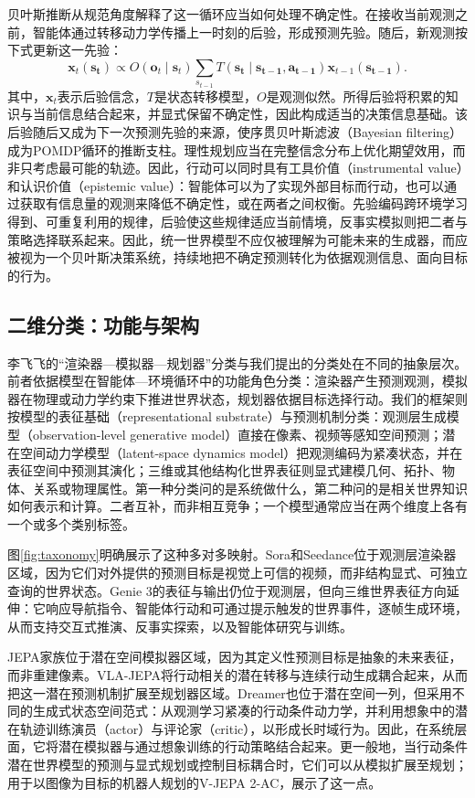 贝叶斯推断从规范角度解释了这一循环应当如何处理不确定性。在接收当前观测之前，智能体通过转移动力学传播上一时刻的后验，形成预测先验。随后，新观测按下式更新这一先验：
\begin{equation}
\mathbf{x}_t(\mathbf{s_t})\propto O(\mathbf{o}_t\mid\mathbf{s}_t)\sum_{s_{t-1}}T(\mathbf{s_t}\mid \mathbf{s_{t-1}},\mathbf{a_{t-1}})\mathbf{x}_{t-1}(\mathbf{s_{t-1}}).
\end{equation}
其中，$\mathbf{x}_t$表示后验信念，$T$是状态转移模型，$O$是观测似然。所得后验将积累的知识与当前信息结合起来，并显式保留不确定性，因此构成适当的决策信息基础。该后验随后又成为下一次预测先验的来源，使序贯贝叶斯滤波（Bayesian filtering）成为POMDP循环的推断支柱。理性规划应当在完整信念分布上优化期望效用，而非只考虑最可能的轨迹。因此，行动可以同时具有工具价值（instrumental value）和认识价值（epistemic value）：智能体可以为了实现外部目标而行动，也可以通过获取有信息量的观测来降低不确定性，或在两者之间权衡。先验编码跨环境学习得到、可重复利用的规律，后验使这些规律适应当前情境，反事实模拟则把二者与策略选择联系起来。因此，统一世界模型不应仅被理解为可能未来的生成器，而应被视为一个贝叶斯决策系统，持续地把不确定预测转化为依据观测信息、面向目标的行为。

\subsection{二维分类：功能与架构}
李飞飞的“渲染器—模拟器—规划器”分类与我们提出的分类处在不同的抽象层次。前者依据模型在智能体—环境循环中的功能角色分类：渲染器产生预测观测，模拟器在物理或动力学约束下推进世界状态，规划器依据目标选择行动。我们的框架则按模型的表征基础（representational substrate）与预测机制分类：观测层生成模型（observation-level generative model）直接在像素、视频等感知空间预测；潜在空间动力学模型（latent-space dynamics model）把观测编码为紧凑状态，并在表征空间中预测其演化；三维或其他结构化世界表征则显式建模几何、拓扑、物体、关系或物理属性。第一种分类问的是系统做什么，第二种问的是相关世界知识如何表示和计算。二者互补，而非相互竞争；一个模型通常应当在两个维度上各有一个或多个类别标签。

图\ref{fig:taxonomy}明确展示了这种多对多映射。Sora和Seedance位于观测层渲染器区域，因为它们对外提供的预测目标是视觉上可信的视频，而非结构显式、可独立查询的世界状态\citep{openai2024sora,gao2025seedance}。Genie 3的表征与输出仍位于观测层，但向三维世界表征方向延伸\citep{genie3}：它响应导航指令、智能体行动和可通过提示触发的世界事件，逐帧生成环境，从而支持交互式推演、反事实探索，以及智能体研究与训练。

JEPA家族位于潜在空间模拟器区域，因为其定义性预测目标是抽象的未来表征，而非重建像素\citep{assran2023ijepa,bardes2024vjepa}。VLA-JEPA将行动相关的潜在转移与连续行动生成耦合起来，从而把这一潜在预测机制扩展至规划器区域\citep{sun2026vlajepa}。Dreamer也位于潜在空间一列，但采用不同的生成式状态空间范式\citep{hafner2019dreamer}：从观测学习紧凑的行动条件动力学，并利用想象中的潜在轨迹训练演员（actor）与评论家（critic），以形成长时域行为。因此，在系统层面，它将潜在模拟器与通过想象训练的行动策略结合起来。更一般地，当行动条件潜在世界模型的预测与显式规划或控制目标耦合时，它们可以从模拟扩展至规划；用于以图像为目标的机器人规划的V-JEPA 2-AC，展示了这一点\citep{assran2025vjepa2}。

